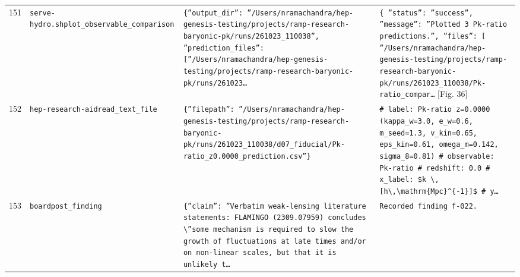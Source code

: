 \documentclass[11pt,a4paper]{article}
\begin{document}
\begin{longtable}{@{}p{}p{}p{}p{}@{}}
151 & \texttt{serve-hydro.sh}\newline\texttt{plot\_\allowbreak{}observable\_\allowbreak{}comparison} & \texttt{\{''output\_\allowbreak{}dir'':\allowbreak{} ''/\allowbreak{}Users/\allowbreak{}nramachandra/\allowbreak{}hep-genesis-testing/\allowbreak{}projects/\allowbreak{}ramp-research-baryonic-pk/\allowbreak{}runs/\allowbreak{}261023\_\allowbreak{}110038'',\allowbreak{} ''prediction\_\allowbreak{}files'':\allowbreak{} [''/\allowbreak{}Users/\allowbreak{}nramachandra/\allowbreak{}hep-genesis-testing/\allowbreak{}projects/\allowbreak{}ramp-research-baryonic-pk/\allowbreak{}runs/\allowbreak{}261023\ldots{}\allowbreak{}} & \texttt{\{   ''status'':\allowbreak{} ''success'',\allowbreak{}   ''message'':\allowbreak{} ''Plotted 3 Pk-ratio predictions.'',\allowbreak{}   ''files'':\allowbreak{} [     ''/\allowbreak{}Users/\allowbreak{}nramachandra/\allowbreak{}hep-genesis-testing/\allowbreak{}projects/\allowbreak{}ramp-research-baryonic-pk/\allowbreak{}runs/\allowbreak{}261023\_\allowbreak{}110038/\allowbreak{}Pk-ratio\_\allowbreak{}compar\ldots{}\allowbreak{}} [Fig. 36] \\
152 & \texttt{hep-research-aid}\newline\texttt{read\_\allowbreak{}text\_\allowbreak{}file} & \texttt{\{''filepath'':\allowbreak{} ''/\allowbreak{}Users/\allowbreak{}nramachandra/\allowbreak{}hep-genesis-testing/\allowbreak{}projects/\allowbreak{}ramp-research-baryonic-pk/\allowbreak{}runs/\allowbreak{}261023\_\allowbreak{}110038/\allowbreak{}d07\_\allowbreak{}fiducial/\allowbreak{}Pk-ratio\_\allowbreak{}z0.0000\_\allowbreak{}prediction.csv''\}\allowbreak{}} & \texttt{\# label:\allowbreak{} Pk-ratio z=\allowbreak{}0.0000 (kappa\_\allowbreak{}w=\allowbreak{}3.0,\allowbreak{} e\_\allowbreak{}w=\allowbreak{}0.6,\allowbreak{} m\_\allowbreak{}seed=\allowbreak{}1.3,\allowbreak{} v\_\allowbreak{}kin=\allowbreak{}0.65,\allowbreak{} eps\_\allowbreak{}kin=\allowbreak{}0.61,\allowbreak{} omega\_\allowbreak{}m=\allowbreak{}0.142,\allowbreak{} sigma\_\allowbreak{}8=\allowbreak{}0.81)\allowbreak{} \# observable:\allowbreak{} Pk-ratio \# redshift:\allowbreak{} 0.0 \# x\_\allowbreak{}label:\allowbreak{} \$k \textbackslash{}\allowbreak{},\allowbreak{} [h\textbackslash{}\allowbreak{},\allowbreak{}\textbackslash{}\allowbreak{}mathrm\{Mpc\}\allowbreak{}\textasciicircum{}\allowbreak{}\{-1\}\allowbreak{}]\allowbreak{}\$ \# y\ldots{}\allowbreak{}} \\
153 & \texttt{board}\newline\texttt{post\_\allowbreak{}finding} & \texttt{\{''claim'':\allowbreak{} ''Verbatim weak-lensing literature statements:\allowbreak{} FLAMINGO (2309.07959)\allowbreak{} concludes \textbackslash{}\allowbreak{}''some mechanism is required to slow the growth of fluctuations at late times and/\allowbreak{}or on non-linear scales,\allowbreak{} but that it is unlikely t\ldots{}\allowbreak{}} & \texttt{Recorded finding f-022.} \\

\end{longtable}
\end{document}
